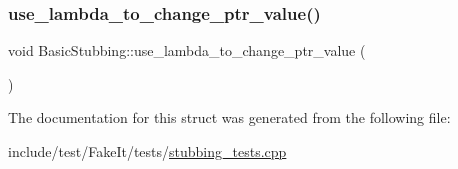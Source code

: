 \mbox{\label{structBasicStubbing_ad40d93160d2ff18c0229ad4fbc3480bc}} 
\subsubsection{\texorpdfstring{use\_lambda\_to\_change\_ptr\_value()}{use\_lambda\_to\_change\_ptr\_value()}}
{\footnotesize\ttfamily void Basic\+Stubbing\+::use\+\_\+lambda\+\_\+to\+\_\+change\+\_\+ptr\+\_\+value (\begin{DoxyParamCaption}{ }\end{DoxyParamCaption})\hspace{0.3cm}{\ttfamily [inline]}}



The documentation for this struct was generated from the following file\+:\begin{DoxyCompactItemize}
\item 
include/test/\+Fake\+It/tests/\mbox{\hyperlink{stubbing__tests_8cpp}{stubbing\+\_\+tests.\+cpp}}\end{DoxyCompactItemize}
